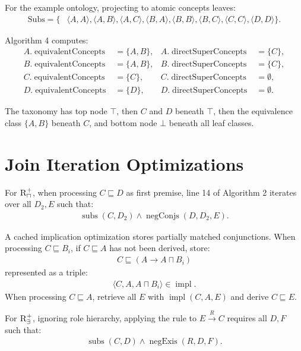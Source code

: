 \documentclass[11pt]{article}
\newcommand{\sub}{\sqsubseteq}
\newcommand{\subs}{\operatorname{subs}}
\newcommand{\negConjs}{\operatorname{negConjs}}
\newcommand{\negExis}{\operatorname{negExis}}
\newcommand{\directSuperConcepts}{\operatorname{directSuperConcepts}}
\newcommand{\equivalentConcepts}{\operatorname{equivalentConcepts}}
\begin{document}
For the example ontology, projecting to atomic concepts leaves:
\begin{align*}
\mathrm{Subs} = \{&\langle A,A\rangle,\langle A,B\rangle,\langle A,C\rangle,
\langle B,A\rangle,\langle B,B\rangle,\langle B,C\rangle,\langle C,C\rangle,\langle D,D\rangle\}.
\end{align*}

Algorithm 4 computes:
\begin{align*}
A.\equivalentConcepts &= \{A,B\}, & A.\directSuperConcepts &= \{C\},\\
B.\equivalentConcepts &= \{A,B\}, & B.\directSuperConcepts &= \{C\},\\
C.\equivalentConcepts &= \{C\}, & C.\directSuperConcepts &= \emptyset,\\
D.\equivalentConcepts &= \{D\}, & D.\directSuperConcepts &= \emptyset.
\end{align*}

The taxonomy has top node $\top$, then $C$ and $D$ beneath $\top$, then the equivalence class $\{A,B\}$ beneath $C$, and bottom node $\bot$ beneath all leaf classes.

\section{Join Iteration Optimizations}

For $\textsc{R}_{\sqcap}^{+}$, when processing $C \sub D$ as first premise, line 14 of Algorithm 2 iterates over all $D_2,E$ such that:
\begin{align*}
\subs(C,D_2) \land \negConjs(D,D_2,E).
\end{align*}

A cached implication optimization stores partially matched conjunctions. When processing $C \sub B_i$, if $C \sub A$ has not been derived, store:
\begin{align*}
C \sub (A \to A \sqcap B_i)
\end{align*}
represented as a triple:
\begin{align*}
\langle C,A,A\sqcap B_i\rangle \in \operatorname{impl}.
\end{align*}
When processing $C \sub A$, retrieve all $E$ with $\operatorname{impl}(C,A,E)$ and derive $C \sub E$.

For $\textsc{R}_{\exists}^{+}$, ignoring role hierarchy, applying the rule to $E \xrightarrow{R} C$ requires all $D,F$ such that:
\begin{align*}
\subs(C,D) \land \negExis(R,D,F).
\end{align*}
\end{document}
